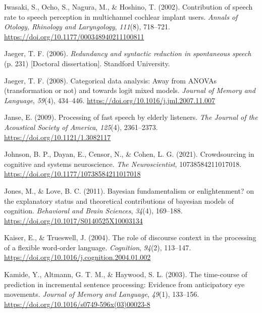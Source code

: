 \documentclass[a4paper, nobind]{templates/ociamthesis}
\newlength{\cslhangindent}
\newenvironment{CSLReferences}[2] %
 {%
  \setlength{\parindent}{0pt}
  \ifodd #1
  \let\oldpar\par
  \def\par{\hangindent=\cslhangindent\oldpar}
  \fi
  \setlength{\parskip}{1mm}
  \setlength{\baselineskip}{6mm}
 }%
 {}
\begin{document}
\begin{CSLReferences}{1}{0}
\leavevmode{}%
Iwasaki, S., Ocho, S., Nagura, M., \& Hoshino, T. (2002). {Contribution of speech rate to speech perception in multichannel cochlear implant users}. \emph{Annals of Otology, Rhinology and Laryngology}, \emph{111}(8), 718--721. \url{https://doi.org/10.1177/000348940211100811}

\leavevmode{}%
Jaeger, T. F. (2006). \emph{{Redundancy and syntactic reduction in spontaneous speech}} (p. 231) {[}Doctoral dissertation{]}. Standford University.

\leavevmode{}%
Jaeger, T. F. (2008). {Categorical data analysis: Away from ANOVAs (transformation or not) and towards logit mixed models}. \emph{Journal of Memory and Language}, \emph{59}(4), 434--446. \url{https://doi.org/10.1016/j.jml.2007.11.007}

\leavevmode{}%
Janse, E. (2009). {Processing of fast speech by elderly listeners}. \emph{The Journal of the Acoustical Society of America}, \emph{125}(4), 2361--2373. \url{https://doi.org/10.1121/1.3082117}

\leavevmode{}%
Johnson, B. P., Dayan, E., Censor, N., \& Cohen, L. G. (2021). {Crowdsourcing in cognitive and systems neuroscience}. \emph{The Neuroscientist}, 10738584211017018. \url{https://doi.org/10.1177/10738584211017018}

\leavevmode{}%
Jones, M., \& Love, B. C. (2011). {Bayesian fundamentalism or enlightenment? on the explanatory status and theoretical contributions of bayesian models of cognition}. \emph{Behavioral and Brain Sciences}, \emph{34}(4), 169--188. \url{https://doi.org/10.1017/S0140525X10003134}

\leavevmode{}%
Kaiser, E., \& Trueswell, J. (2004). The role of discourse context in the processing of a flexible word-order language. \emph{Cognition}, \emph{94}(2), 113--147. \url{https://doi.org/10.1016/j.cognition.2004.01.002}

\leavevmode{}%
Kamide, Y., Altmann, G. T. M., \& Haywood, S. L. (2003). The time-course of prediction in incremental sentence processing: Evidence from anticipatory eye movements. \emph{Journal of Memory and Language}, \emph{49}(1), 133--156. \url{https://doi.org/10.1016/s0749-596x(03)00023-8}


\end{CSLReferences}
\end{document}
